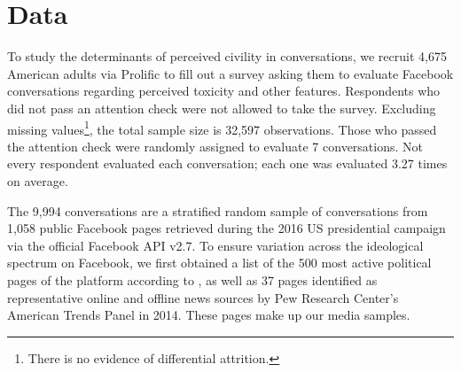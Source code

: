 \documentclass{article}
\begin{document}



\section{Data}

To study the determinants of perceived civility in conversations, we recruit 4,675 American adults via Prolific to fill out a survey asking them to evaluate Facebook conversations regarding perceived toxicity and other features. Respondents who did not pass an attention check were not allowed to take the survey. Excluding missing values\footnote{There is no evidence of differential attrition.}, the total sample size is 32,597 observations. Those who passed the attention check were randomly assigned to evaluate 7 conversations. Not every respondent evaluated each conversation; each one was evaluated 3.27 times on average. 

The 9,994 conversations are a stratified random sample of conversations from 1,058 public Facebook pages retrieved during the 2016 US presidential campaign via the official Facebook API v2.7. To ensure variation across the ideological spectrum on Facebook, we first obtained a list of the 500 most active political pages of the platform according to \citet{bakshy_exposure_2015}, as well as 37 pages identified as representative online and offline news sources by Pew Research Center’s American Trends Panel in 2014. These pages make up our media samples.
\end{document}
